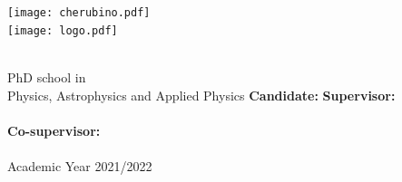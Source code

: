 


\begin{center}

	\hspace*{-15pt}
	\texttt{[image: cherubino.pdf]}\\
	\texttt{[image: logo.pdf]}
	\vspace*{100pt}
	{\Huge \\\myTitle}
	
	\vspace*{30pt}
	\myDepartment\\
	PhD school in\\
	Physics, Astrophysics and Applied Physics
	\vfill
	\textbf{Candidate:} \hfill \textbf{Supervisor:}\\
	\myName \hfill \myProf\\
	\vspace*{5pt}
	\hfill \textbf{Co-supervisor:}\\
	\hfill \myOtherProf\\
	\vspace*{15pt}
	Academic Year 2021/2022
\end{center}
	
	

\cleardoublepage
